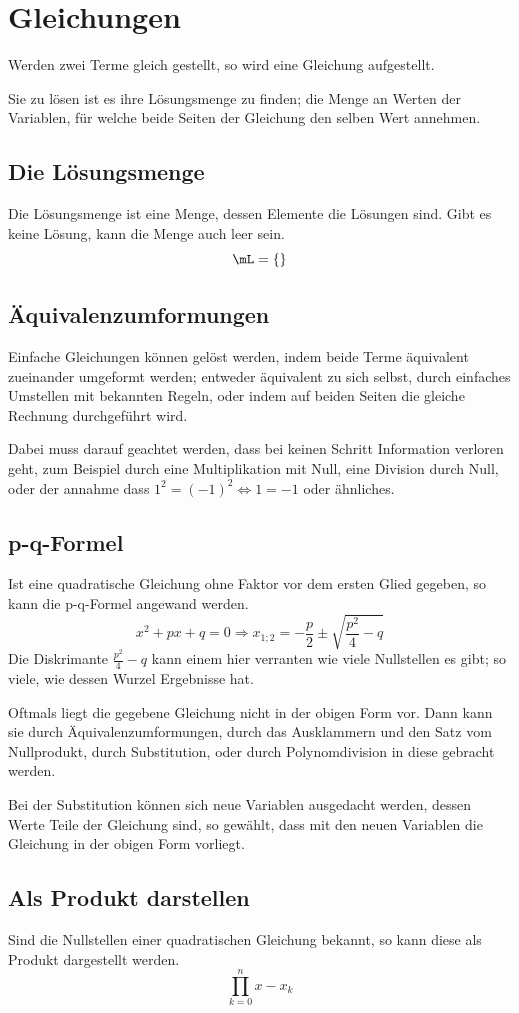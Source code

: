 \documentclass{article}
\begin{document}
\section{Gleichungen}
Werden zwei Terme gleich gestellt, so wird eine Gleichung aufgestellt.

Sie zu lösen ist es ihre Lösungsmenge zu finden; die Menge an Werten der Variablen, für welche beide Seiten der Gleichung den selben Wert annehmen.

\subsection{Die Lösungsmenge}
Die Lösungsmenge \tL ist eine Menge, dessen Elemente die Lösungen sind. Gibt es keine Lösung, kann die Menge auch leer sein.
\[
 \mL = \{\}
\]

\subsection{Äquivalenzumformungen}
Einfache Gleichungen können gelöst werden, indem beide Terme äquivalent zueinander umgeformt werden; entweder äquivalent zu sich selbst, durch einfaches Umstellen mit bekannten Regeln, oder indem auf beiden Seiten die gleiche Rechnung durchgeführt wird.

Dabei muss darauf geachtet werden, dass bei keinen Schritt Information verloren geht, zum Beispiel durch eine Multiplikation mit Null, eine Division durch Null, oder der annahme dass ${1^2 = (-1)^2 \Leftrightarrow 1 = -1}$ oder ähnliches.

\subsection{p-q-Formel}
Ist eine quadratische Gleichung ohne Faktor vor dem ersten Glied gegeben, so kann die p-q-Formel angewand werden.
\[
 x^2 + px + q = 0
 \Rightarrow
 x_{1;2} = -\frac{p}{2} \pm \sqrt{\frac{p^2}{4}-q}
\]
Die Diskrimante $\frac{p^2}{4}-q$ kann einem hier verranten wie viele Nullstellen es gibt; so viele, wie dessen Wurzel Ergebnisse hat.

Oftmals liegt die gegebene Gleichung nicht in der obigen Form vor. Dann kann sie durch Äquivalenzumformungen, durch das Ausklammern und den Satz vom Nullprodukt, durch Substitution, oder durch Polynomdivision in diese gebracht werden.

Bei der Substitution können sich neue Variablen ausgedacht werden, dessen Werte Teile der Gleichung sind, so gewählt, dass mit den neuen Variablen die Gleichung in der obigen Form vorliegt.

\subsection{Als Produkt darstellen}
Sind die Nullstellen einer quadratischen Gleichung bekannt, so kann diese als Produkt dargestellt werden.
\[
 \prod_{k=0}^n x-x_k
\]
\end{document}
